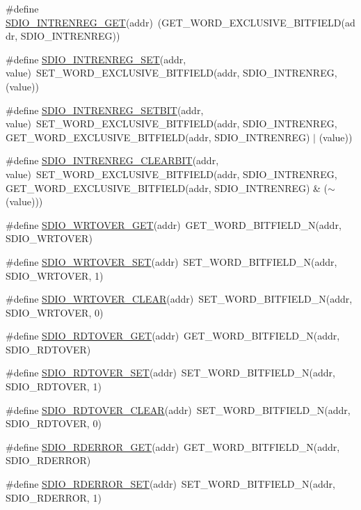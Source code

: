 \begin{DoxyCompactItemize}
\item 
\#define \hyperlink{a00570_a3a4be97664d67629b060f0f17fb21775}{SDIO\_\-INTRENREG\_\-GET}(addr)~(GET\_\-WORD\_\-EXCLUSIVE\_\-BITFIELD(addr, SDIO\_\-INTRENREG))
\item 
\#define \hyperlink{a00570_a306ee49e5932820c16f8ba143762d55d}{SDIO\_\-INTRENREG\_\-SET}(addr, value)~SET\_\-WORD\_\-EXCLUSIVE\_\-BITFIELD(addr, SDIO\_\-INTRENREG, (value))
\item 
\#define \hyperlink{a00570_aa82e4a96775a91d9525d0f64518e9f66}{SDIO\_\-INTRENREG\_\-SETBIT}(addr, value)~SET\_\-WORD\_\-EXCLUSIVE\_\-BITFIELD(addr, SDIO\_\-INTRENREG, GET\_\-WORD\_\-EXCLUSIVE\_\-BITFIELD(addr, SDIO\_\-INTRENREG) $|$ (value))
\item 
\#define \hyperlink{a00570_a73cfe3e18d647770bb7d1875a8fe6bc1}{SDIO\_\-INTRENREG\_\-CLEARBIT}(addr, value)~SET\_\-WORD\_\-EXCLUSIVE\_\-BITFIELD(addr, SDIO\_\-INTRENREG, GET\_\-WORD\_\-EXCLUSIVE\_\-BITFIELD(addr, SDIO\_\-INTRENREG) \& ($\sim$(value)))
\item 
\#define \hyperlink{a00570_a167f655309af12e2ae264c0f49882837}{SDIO\_\-WRTOVER\_\-GET}(addr)~GET\_\-WORD\_\-BITFIELD\_\-N(addr, SDIO\_\-WRTOVER)
\item 
\#define \hyperlink{a00570_aa6ab06ee5b6b9c6f9adaf76c95f8a805}{SDIO\_\-WRTOVER\_\-SET}(addr)~SET\_\-WORD\_\-BITFIELD\_\-N(addr, SDIO\_\-WRTOVER, 1)
\item 
\#define \hyperlink{a00570_a853a64ebc95c78cf7870fd7a6659b68a}{SDIO\_\-WRTOVER\_\-CLEAR}(addr)~SET\_\-WORD\_\-BITFIELD\_\-N(addr, SDIO\_\-WRTOVER, 0)
\item 
\#define \hyperlink{a00570_a7b1975ad6def0257234d3fc1cdc3ef42}{SDIO\_\-RDTOVER\_\-GET}(addr)~GET\_\-WORD\_\-BITFIELD\_\-N(addr, SDIO\_\-RDTOVER)
\item 
\#define \hyperlink{a00570_a0716bd507f59f0390acd2401f363386f}{SDIO\_\-RDTOVER\_\-SET}(addr)~SET\_\-WORD\_\-BITFIELD\_\-N(addr, SDIO\_\-RDTOVER, 1)
\item 
\#define \hyperlink{a00570_ac985664f3eb0711a351d2a1a2788f115}{SDIO\_\-RDTOVER\_\-CLEAR}(addr)~SET\_\-WORD\_\-BITFIELD\_\-N(addr, SDIO\_\-RDTOVER, 0)
\item 
\#define \hyperlink{a00570_ac99a1c45f8740dfb1d11d0152ac9862d}{SDIO\_\-RDERROR\_\-GET}(addr)~GET\_\-WORD\_\-BITFIELD\_\-N(addr, SDIO\_\-RDERROR)
\item 
\#define \hyperlink{a00570_adffbf7b56d5c6f16581de468f48eec4d}{SDIO\_\-RDERROR\_\-SET}(addr)~SET\_\-WORD\_\-BITFIELD\_\-N(addr, SDIO\_\-RDERROR, 1)
\item 

\end{DoxyCompactItemize}
